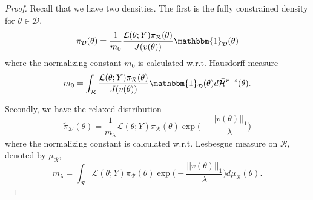 \documentclass[10pt,fleqn]{article}
\newcommand{\bb}[1]{\mathbb{#1}} \newcommand{\mc}[1]{\mathcal{#1}}
\DeclareMathOperator{\1}{\mathbbm{1}} \DeclareMathOperator{\bigO}{\mc O}
\begin{document}
\begin{proof}
Recall that we have two densities. The first is the fully constrained density for $\theta\in\mathcal{D}$.
\begin{equation*}
\pi_\mathcal{D}(\theta) = \frac{1}{m_0} \frac{\mathcal{L}(\theta;Y)\pi_\mathcal{R}(\theta)}{J(v(\theta))}\mathbbm{1}_\mathcal{D}(\theta)
\end{equation*}
where the normalizing constant $m_0$ is calculated w.r.t. Hausdorff measure
$$m_0 = \int_\mathcal{R} \frac{\mathcal{L}(\theta;Y)\pi_\mathcal{R}(\theta)}{J(v(\theta))}\mathbbm{1}_\mathcal{D}(\theta)d\bar{\mathcal{H}}^{r-s}(\theta).$$

Secondly, we have the relaxed distribution
$$\tilde{\pi}_\mathcal{D}(\theta) = \frac{1}{m_\lambda} \mathcal{L}(\theta;Y)\pi_\mathcal{R}(\theta)\exp\bigg(-\frac{||v(\theta)||_1}{\lambda}\bigg)$$
where the normalizing constant is calculated w.r.t. Lesbesgue measure on $\mathcal{R}$, denoted by $\mu_\mathcal{R}$,
$$m_\lambda = \int_\mathcal{R}\mathcal{L}(\theta;Y)\pi_\mathcal{R}(\theta)\exp\bigg(-\frac{||v(\theta)||_1}{\lambda}\bigg) d\mu_\mathcal{R}(\theta).$$




\end{proof}
\end{document}
